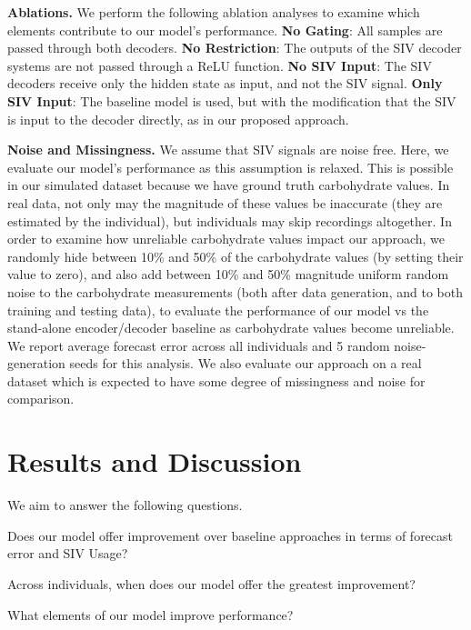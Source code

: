 \documentclass[letterpaper]{article}
\begin{document}
\textbf{Ablations.}  We perform the following ablation analyses to examine which elements contribute to our model's performance. \textbf{No Gating}: All samples are passed through both decoders. \textbf{No Restriction}: The outputs of the SIV decoder systems are not passed through a ReLU function. \textbf{No SIV Input}: The SIV decoders receive only the hidden state as input, and not the SIV signal. \textbf{Only SIV Input}: The baseline model is used, but with the modification that the SIV is input to the decoder directly, as in our proposed approach.

\textbf{Noise and Missingness.} We assume that SIV signals are noise free. Here, we evaluate our model's performance as this assumption is relaxed. This is possible in our simulated dataset because we have ground truth carbohydrate values. In real data, not only may the magnitude of these values be inaccurate (they are estimated by the individual), but individuals may skip recordings altogether. In order to examine how unreliable carbohydrate values impact our approach, we randomly hide between 10\% and 50\% of the carbohydrate values (by setting their value to zero), and also add between 10\% and 50\% magnitude uniform random noise to the carbohydrate measurements (both after data generation, and to both training and testing data), to evaluate the performance of our model vs the stand-alone encoder/decoder baseline as carbohydrate values become unreliable. We report average forecast error across all individuals and 5 random noise-generation seeds for this analysis. We also evaluate our approach on a real dataset which is expected to have some degree of missingness and noise for comparison.






\section{Results and Discussion}





 We aim to answer the following questions.

     Does our model offer improvement over baseline approaches in terms of forecast error and SIV Usage? 
    
     Across individuals, when does our model offer the greatest improvement? 
    
     What elements of our model improve performance? 
    
\end{document}
